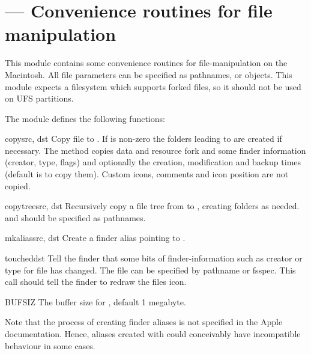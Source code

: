 \section{ ---
         Convenience routines for file manipulation}



This module contains some convenience routines for file-manipulation
on the Macintosh. All file parameters can be specified as
pathnames,  or  objects.  This module
expects a filesystem which supports forked files, so it should not
be used on UFS partitions.

The  module defines the following functions:


\begin{funcdesc}{copy}{src, dst}
Copy file  to .  If  is non-zero
the folders leading to  are created if necessary.
The method copies data and
resource fork and some finder information (creator, type, flags) and
optionally the creation, modification and backup times (default is to
copy them). Custom icons, comments and icon position are not copied.
\end{funcdesc}

\begin{funcdesc}{copytree}{src, dst}
Recursively copy a file tree from  to , creating
folders as needed.  and  should be specified as
pathnames.
\end{funcdesc}

\begin{funcdesc}{mkalias}{src, dst}
Create a finder alias  pointing to .
\end{funcdesc}

\begin{funcdesc}{touched}{dst}
Tell the finder that some bits of finder-information such as creator
or type for file  has changed. The file can be specified by
pathname or fsspec. This call should tell the finder to redraw the
files icon.
\end{funcdesc}

\begin{datadesc}{BUFSIZ}
The buffer size for , default 1 megabyte.
\end{datadesc}

Note that the process of creating finder aliases is not specified in
the Apple documentation. Hence, aliases created with 
could conceivably have incompatible behaviour in some cases.


